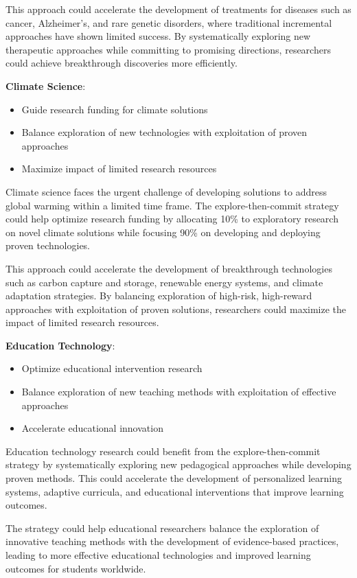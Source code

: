\documentclass[letterpaper]{article} %
\begin{document}
{{{{{{{{{This approach could accelerate the development of treatments for diseases such as cancer, Alzheimer's, and rare genetic disorders, where traditional incremental approaches have shown limited success. By systematically exploring new therapeutic approaches while committing to promising directions, researchers could achieve breakthrough discoveries more efficiently.

\textbf{Climate Science}:
\begin{itemize}
\item Guide research funding for climate solutions
\item Balance exploration of new technologies with exploitation of proven approaches
\item Maximize impact of limited research resources
\end{itemize}

Climate science faces the urgent challenge of developing solutions to address global warming within a limited time frame. The explore-then-commit strategy could help optimize research funding by allocating 10\% to exploratory research on novel climate solutions while focusing 90\% on developing and deploying proven technologies.

This approach could accelerate the development of breakthrough technologies such as carbon capture and storage, renewable energy systems, and climate adaptation strategies. By balancing exploration of high-risk, high-reward approaches with exploitation of proven solutions, researchers could maximize the impact of limited research resources.

\textbf{Education Technology}:
\begin{itemize}
\item Optimize educational intervention research
\item Balance exploration of new teaching methods with exploitation of effective approaches
\item Accelerate educational innovation
\end{itemize}

Education technology research could benefit from the explore-then-commit strategy by systematically exploring new pedagogical approaches while developing proven methods. This could accelerate the development of personalized learning systems, adaptive curricula, and educational interventions that improve learning outcomes.

The strategy could help educational researchers balance the exploration of innovative teaching methods with the development of evidence-based practices, leading to more effective educational technologies and improved learning outcomes for students worldwide.

}}}}}}}}}
\end{document}
